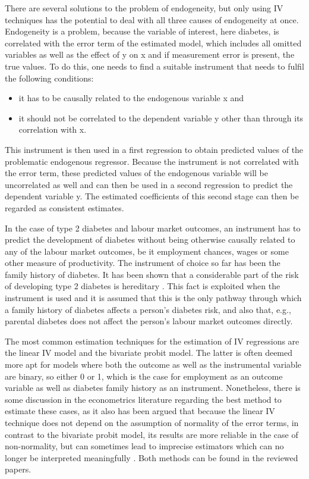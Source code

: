 There are several solutions to the problem of endogeneity, but only using \ac{IV} techniques has the potential to deal with all three causes of endogeneity at once. Endogeneity is a problem, because the variable of interest, here diabetes, is correlated with the error term of the estimated model, which includes all omitted variables as well as the effect of y on x and if measurement error is present, the true values. To do this, one needs to find a suitable instrument that needs to fulfil the following conditions:
\begin{itemize}
\item	it has to be causally related to the endogenous variable x and
\item	it should not be correlated to the dependent variable y other than through its correlation with x.
\end{itemize}
This instrument is then used in a first regression to obtain predicted values of the problematic endogenous regressor. Because the instrument is not correlated with the error term, these predicted values of the endogenous variable will be uncorrelated as well and can then be used in a second regression to predict the dependent variable y. The estimated coefficients of this second stage can then be regarded as consistent estimates.

In the case of type 2 diabetes and labour market outcomes, an instrument has to predict the development of diabetes without being otherwise causally related to any of the labour market outcomes, be it employment chances, wages or some other measure of productivity. The instrument of choice so far has been the family history of diabetes. It has been shown that a considerable part of the risk of developing type 2 diabetes is hereditary \parencite{Herder2011,Hemminki2010,TheInteractConsortium2013}. This fact is exploited when the instrument is used and it is assumed that this is the only pathway through which a family history of diabetes affects a person's diabetes risk, and also that, e.g., parental diabetes does not affect the person's labour market outcomes directly.

The most common estimation techniques for the estimation of \ac{IV} regressions are the linear \ac{IV} model and the bivariate probit model. The latter is often deemed more apt for models where both the outcome as well as the instrumental variable are binary, so either 0 or 1, which is the case for employment as an outcome variable as well as diabetes family history as an instrument. Nonetheless, there is some discussion in the econometrics literature regarding the best method to estimate these cases, as it also has been argued that because the linear \ac{IV} technique does not depend on the assumption of normality of the error terms, in contrast to the bivariate probit model, its results are more reliable in the case of non-normality, but can sometimes lead to imprecise estimators which can no longer be interpreted meaningfully \parencite{Chiburis2012}. Both methods can be found in the reviewed papers.

